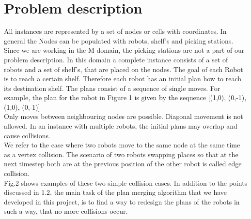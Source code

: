 \documentclass{llncs}
\begin{document}
\newpage

\section{Problem description}
All instances are represented by a set of nodes or cells with coordinates. In general the Nodes can be populated with robots, shelf's and picking stations. Since we are working in the M domain, the picking stations are not a part of our problem description.
In this domain a complete instance consists of a set of robots and a set of shelf's, that are placed on the nodes. The goal of each Robot is to reach a certain shelf. Therefore each robot has an initial plan how to reach its destination shelf. The plans consist of a sequence of single moves. For example, the plan for the robot in Figure 1 is given by the sequence [(1,0), (0,-1), (1,0), (0,-1)]\\
Only moves between neighbouring nodes are possible. Diagonal movement is not allowed.
In an instance with multiple robots, the initial plans may overlap and cause collisions.\\
We refer to the case where two robots move to the same node at the same time as a vertex collision. The scenario of two robots swapping places so that at the next timestep both are at the previous position of the other robot is called edge collision.\\
Fig.2 shows examples of these two simple collision cases.
In addition to the points discussed in 1.2. the main task of the plan merging algorithm that we have developed in this project, is to find a way to redesign the plans of the robots in such a way, that no more collisions occur.
\end{document}
